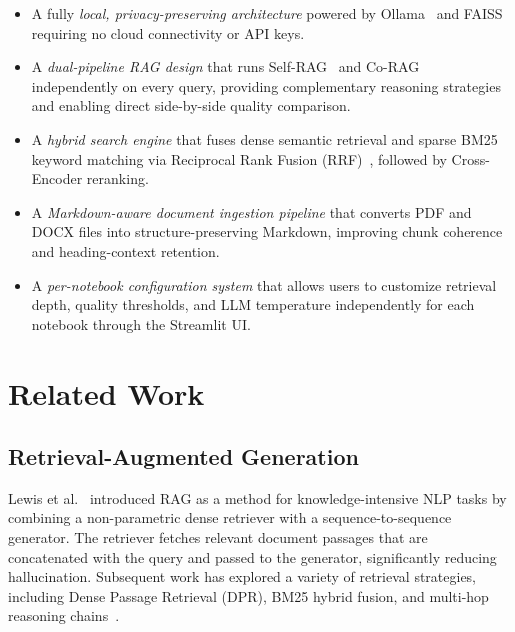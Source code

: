 \documentclass[10pt, conference, a4paper, compsocconf]{IEEEtran}
\begin{document}
\begin{itemize}
  \item A fully \emph{local, privacy-preserving architecture} powered by
        Ollama~\cite{ollama} and FAISS~\cite{faiss} requiring no cloud
        connectivity or API keys.

  \item A \emph{dual-pipeline RAG design} that runs Self-RAG~\cite{selfrag_asai2023}
        and Co-RAG~\cite{corag_jin2025} independently on every query,
        providing complementary reasoning strategies and enabling
        direct side-by-side quality comparison.

  \item A \emph{hybrid search engine} that fuses dense semantic retrieval
        and sparse BM25 keyword matching via Reciprocal Rank Fusion
        (RRF)~\cite{hybrid_search}, followed by Cross-Encoder reranking.

  \item A \emph{Markdown-aware document ingestion pipeline} that converts
        PDF and DOCX files into structure-preserving Markdown, improving
        chunk coherence and heading-context retention.

  \item A \emph{per-notebook configuration system} that allows users to
        customize retrieval depth, quality thresholds, and LLM temperature
        independently for each notebook through the Streamlit UI.
\end{itemize}


\section{Related Work}

\subsection{Retrieval-Augmented Generation}
Lewis et al.~\cite{rag_lewis2020} introduced RAG as a method for
knowledge-intensive NLP tasks by combining a non-parametric dense retriever
with a sequence-to-sequence generator. The retriever fetches relevant
document passages that are concatenated with the query and passed to the
generator, significantly reducing hallucination. Subsequent work has
explored a variety of retrieval strategies, including Dense Passage
Retrieval (DPR), BM25 hybrid fusion, and multi-hop reasoning
chains~\cite{hybrid_search}.
\end{document}
